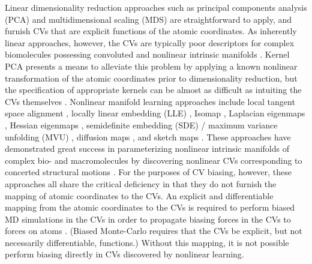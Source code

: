 \documentclass[12pt]{article}
\newcommand*{\groen}[1]{#1}
\begin{document}
Linear dimensionality reduction approaches such as principal components analysis (\groen{PCA})\cite{pearson1901liii,garcia1992large,ichiye1991collective} and multidimensional scaling (\groen{MDS}) \cite{troyer1995protein} are straightforward to apply, and furnish CVs that are explicit functions of the atomic coordinates. As inherently linear approaches, however, the CVs are typically poor descriptors for complex biomolecules possessing convoluted and nonlinear intrinsic manifolds \cite{rohrdanz2013discovering,ferguson2011nonlinear,ferguson2010systematic}. Kernel PCA presents a means to alleviate this problem by applying a known nonlinear transformation of the atomic coordinates prior to dimensionality reduction\cite{scholkopf1997kernel}, but the specification of appropriate kernels can be almost as difficult as intuiting the CVs themselves \cite{ferguson2011nonlinear}. Nonlinear manifold learning approaches include local tangent space alignment \cite{wang2011geometric}, locally linear embedding (\groen{LLE}) \cite{roweis2000nonlinear,zhang2007mlle}, Isomap \cite{das2006low,tenenbaum2000global,weinberger2006unsupervised,li2006version}, Laplacian eigenmaps \cite{belkin2002laplacian}, Hessian eigenmaps \cite{donoho2003hessian}, semidefinite embedding (\groen{SDE}) / maximum variance unfolding (\groen{MVU}) \cite{weinberger2006unsupervised}, diffusion maps \cite{ferguson2011integrating,ferguson2010systematic,coifman2006diffusion,rohrdanz2011determination,preto2014fast}, and sketch maps \cite{ceriotti2011simplifying,tribello2012using,ceriotti2013demonstrating}. These approaches have demonstrated great success in parameterizing nonlinear intrinsic manifolds of complex bio- and macromolecules by discovering nonlinear CVs corresponding to concerted structural motions \cite{ferguson2011integrating,ferguson2010systematic,das2006low,stamati2010application,rohrdanz2011determination,preto2014fast,ferguson2010experimental,zheng2011polymer,zheng2013rapid}. For the purposes of CV biasing, however, these approaches all share the critical deficiency in that they do not furnish the mapping of atomic coordinates to the CVs. An explicit and differentiable mapping from the atomic coordinates to the CVs is required to perform biased MD simulations in the CVs in order to propagate biasing forces in the CVs to forces on atoms \cite{hashemian2013modeling,rohrdanz2013discovering,ferguson2011nonlinear,spiwok2011metadynamics,fiorin2013using}. (Biased Monte-Carlo requires that the CVs be explicit, but not necessarily differentiable, functions.) Without this mapping, it is not possible perform biasing directly in CVs discovered by nonlinear learning.
\end{document}
